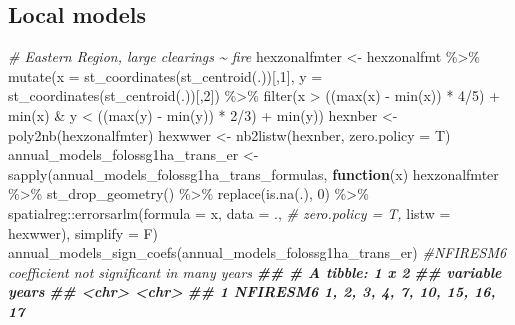 \documentclass[10pt,landscape,a3paper]{article}
\newenvironment{Shaded}{\begin{snugshade}}{\end{snugshade}}
\newcommand{\AttributeTok}[1]{\textcolor[rgb]{0.77,0.63,0.00}{#1}}
\newcommand{\CommentTok}[1]{\textcolor[rgb]{0.56,0.35,0.01}{\textit{#1}}}
\newcommand{\ControlFlowTok}[1]{\textcolor[rgb]{0.13,0.29,0.53}{\textbf{#1}}}
\newcommand{\DecValTok}[1]{\textcolor[rgb]{0.00,0.00,0.81}{#1}}
\newcommand{\DocumentationTok}[1]{\textcolor[rgb]{0.56,0.35,0.01}{\textbf{\textit{#1}}}}
\newcommand{\FunctionTok}[1]{\textcolor[rgb]{0.00,0.00,0.00}{#1}}
\newcommand{\NormalTok}[1]{#1}
\newcommand{\OtherTok}[1]{\textcolor[rgb]{0.56,0.35,0.01}{#1}}
\newcommand{\SpecialCharTok}[1]{\textcolor[rgb]{0.00,0.00,0.00}{#1}}
\begin{document}
\hypertarget{local-models}{%
\subsection{Local models}\label{local-models}}

\begin{Shaded}
\begin{Highlighting}[]
\CommentTok{\# Eastern Region, large clearings \textasciitilde{} fire}
\NormalTok{hexzonalfmter }\OtherTok{\textless{}{-}}\NormalTok{ hexzonalfmt }\SpecialCharTok{\%\textgreater{}\%}
  \FunctionTok{mutate}\NormalTok{(}\AttributeTok{x =} \FunctionTok{st\_coordinates}\NormalTok{(}\FunctionTok{st\_centroid}\NormalTok{(.))[,}\DecValTok{1}\NormalTok{], }\AttributeTok{y =} \FunctionTok{st\_coordinates}\NormalTok{(}\FunctionTok{st\_centroid}\NormalTok{(.))[,}\DecValTok{2}\NormalTok{]) }\SpecialCharTok{\%\textgreater{}\%}
  \FunctionTok{filter}\NormalTok{(x }\SpecialCharTok{\textgreater{}}\NormalTok{ ((}\FunctionTok{max}\NormalTok{(x) }\SpecialCharTok{{-}} \FunctionTok{min}\NormalTok{(x)) }\SpecialCharTok{*} \DecValTok{4}\SpecialCharTok{/}\DecValTok{5}\NormalTok{) }\SpecialCharTok{+} \FunctionTok{min}\NormalTok{(x) }\SpecialCharTok{\&}\NormalTok{ y }\SpecialCharTok{\textless{}}\NormalTok{ ((}\FunctionTok{max}\NormalTok{(y) }\SpecialCharTok{{-}} \FunctionTok{min}\NormalTok{(y)) }\SpecialCharTok{*} \DecValTok{2}\SpecialCharTok{/}\DecValTok{3}\NormalTok{) }\SpecialCharTok{+} \FunctionTok{min}\NormalTok{(y))}
\NormalTok{hexnber }\OtherTok{\textless{}{-}} \FunctionTok{poly2nb}\NormalTok{(hexzonalfmter)}
\NormalTok{hexwwer }\OtherTok{\textless{}{-}} \FunctionTok{nb2listw}\NormalTok{(hexnber, }\AttributeTok{zero.policy =}\NormalTok{ T)}
\NormalTok{annual\_models\_folossg1ha\_trans\_er }\OtherTok{\textless{}{-}} \FunctionTok{sapply}\NormalTok{(annual\_models\_folossg1ha\_trans\_formulas,}
                        \ControlFlowTok{function}\NormalTok{(x)}
\NormalTok{                          hexzonalfmter }\SpecialCharTok{\%\textgreater{}\%}
                          \FunctionTok{st\_drop\_geometry}\NormalTok{() }\SpecialCharTok{\%\textgreater{}\%}
                          \FunctionTok{replace}\NormalTok{(}\FunctionTok{is.na}\NormalTok{(.), }\DecValTok{0}\NormalTok{) }\SpecialCharTok{\%\textgreater{}\%}
\NormalTok{                          spatialreg}\SpecialCharTok{::}\FunctionTok{errorsarlm}\NormalTok{(}\AttributeTok{formula =}\NormalTok{ x,}
                                                 \AttributeTok{data =}\NormalTok{ ., }\CommentTok{\# zero.policy = T,}
                                                 \AttributeTok{listw =}\NormalTok{ hexwwer),}
                        \AttributeTok{simplify =}\NormalTok{ F)}
\FunctionTok{annual\_models\_sign\_coefs}\NormalTok{(annual\_models\_folossg1ha\_trans\_er) }\CommentTok{\#NFIRESM6 coefficient not significant in many years}
\DocumentationTok{\#\# \# A tibble: 1 x 2}
\DocumentationTok{\#\#   variable years                        }
\DocumentationTok{\#\#   \textless{}chr\textgreater{}    \textless{}chr\textgreater{}                        }
\DocumentationTok{\#\# 1 NFIRESM6 1, 2, 3, 4, 7, 10, 15, 16, 17}


\end{Highlighting}
\end{Shaded}
\end{document}
